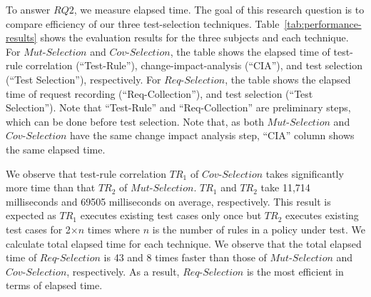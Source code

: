 To answer $RQ2$, we measure elapsed time.
The goal of this research question is to compare efficiency of our three
test-selection techniques.
Table~\ref{tab:performance-results} shows the evaluation results for the three subjects and
each technique.
For $Mut$-$Selection$ and $Cov$-$Selection$, the table shows the elapsed time of
test-rule correlation (``Test-Rule''), change-impact-analysis (``CIA''), and test
selection (``Test Selection''), respectively.
For $Req$-$Selection$, the table shows the elapsed time of
request recording (``Req-Collection''), and test
selection (``Test Selection'').
Note that ``Test-Rule'' and ``Req-Collection'' are preliminary steps, which
can be done before test selection.
Note that, as both $Mut$-$Selection$ and $Cov$-$Selection$ have the same
change impact analysis step, ``CIA'' column shows the same elapsed
time.
 
We observe that test-rule correlation $TR_1$ of $Cov$-$Selection$ takes
significantly more time than that $TR_2$ of $Mut$-$Selection$.
$TR_1$ and $TR_2$ take 11,714 milliseconds and 69505 milliseconds on average, respectively.
This result is expected as $TR_1$ executes existing test cases only once
but $TR_2$ executes existing test cases for 2$\times$$n$ times where $n$
is the number of rules in a policy under test.
We calculate total elapsed time for each technique. We observe that the total elapsed time of $Req$-$Selection$ is 43 and 8 times
faster than those of $Mut$-$Selection$  and $Cov$-$Selection$, respectively.
As a result, $Req$-$Selection$ is the most efficient
in terms of elapsed time.

%
%






%



